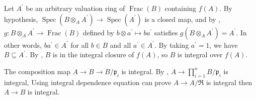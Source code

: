 \begin{exercise}\label{ex5.35}
	Let $A^\prime$ be an arbitrary valuation ring of $\operatorname{Frac}(B)$ containing $f(A)$. By hypothesis, $\operatorname{Spec}\left(B\otimes_AA^\prime\right)\rightarrow\operatorname{Spec}\left(A^\prime\right)$ is a closed map, and by , $g:B\otimes_AA^\prime\rightarrow\operatorname{Frac}(B)$ defined by $b\otimes a^\prime\mapsto ba^\prime$ satisfies $g\left(B\otimes_AA^\prime\right)=A^\prime$. In other words, $ba^\prime\in A^\prime$ for all $b\in B$ and all $a^\prime\in A^\prime$. By taking $a^\prime=1$, we have $B\subseteq A^\prime$. By , $B$ is in the integral closure of $f(A)$, so $B$ is integral over $f(A)$.
	
	The composition map $A\rightarrow B\rightarrow B/\mathfrak{p}_i$ is integral. By , $A\rightarrow\prod_{i=1}^nB/\mathfrak{p}_i$ is integral, Using integral dependence equation can prove $A\rightarrow A/\mathfrak{R}$ is integral then $A\rightarrow B$ is integral.
\end{exercise}
